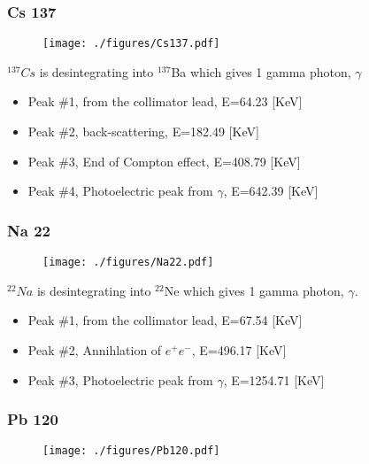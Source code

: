\documentclass[a4paper,12pt,oneside]{article}
\begin{document}
\newpage
\subsubsection{Cs 137}
\begin{figure}[h!]
  \begin{center}
  \texttt{[image: ./figures/Cs137.pdf]}
  \caption{} \label{fig:Cs137}
  \end{center}
\end{figure}

$^{137}Cs$ is desintegrating into $^{137}$Ba which gives 1 gamma photon, $\gamma$

\begin{itemize}
\item Peak \#1, from the collimator lead, E=64.23 [KeV]
\item Peak \#2, back-scattering, E=182.49 [KeV]
\item Peak \#3, End of Compton effect, E=408.79 [KeV]
\item Peak \#4, Photoelectric peak from $\gamma$, E=642.39 [KeV]
\end{itemize}


\newpage
\subsubsection{Na 22}
\begin{figure}[h!]
  \begin{center}
  \texttt{[image: ./figures/Na22.pdf]}
  \caption{} \label{fig:Na22}
  \end{center}
\end{figure}

$^{22}Na$ is desintegrating into $^{22}$Ne which gives 1 gamma photon, $\gamma$.

\begin{itemize}
\item Peak \#1, from the collimator lead, E=67.54 [KeV]
\item Peak \#2, Annihlation of $e^+e^-$, E=496.17 [KeV]
\item Peak \#3, Photoelectric peak from $\gamma$, E=1254.71 [KeV]
\end{itemize}


\newpage
\subsubsection{Pb 120}
\begin{figure}[h!]
  \begin{center}
  \texttt{[image: ./figures/Pb120.pdf]}
  \caption{} \label{fig:Pb120}
  \end{center}
\end{figure}
\end{document}
